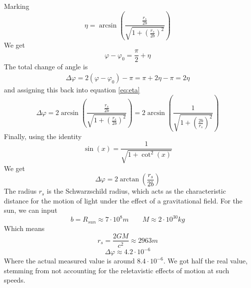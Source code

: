 \documentclass{article}
\begin{document}
Marking
\begin{equation}
\label{eq:eta}
    \eta = \arcsin\left(\frac{\frac{r_s}{2b}}{\sqrt{1 + \left(\frac{r_s}{2b}\right)^2}}\right)
\end{equation}
We get
\begin{equation}
    \varphi - \varphi_0 = \frac{\pi}{2} + \eta
\end{equation}
The total change of angle is
\begin{equation}
\begin{gathered}
    \Delta\varphi = 2(\varphi - \varphi_0) - \pi = \pi + 2\eta - \pi = 2\eta
\end{gathered}
\end{equation}
and assigning this back into equation \ref{eq:eta}
\begin{equation}
    \Delta\varphi = 2\arcsin\left(\frac{\frac{r_s}{2b}}{\sqrt{1 + \left(\frac{r_s}{2b}\right)^2}}\right) = 2\arcsin\left(\frac{1}{\sqrt{1 + \left(\frac{2b}{r_s}\right)^2}}\right)
\end{equation}
Finally, using the identity
\begin{equation}
    \sin(x) = \frac{1}{\sqrt{1+\cot^2(x)}}
\end{equation}
We get
\begin{equation}
    \Delta\varphi = 2\arctan(\frac{r_s}{2b})
\end{equation}
The radius $r_s$ is the Schwarzschild radius, which acts as the characteristic distance for the motion of light under the effect of a gravitational field.
\newline
\newline
For the sun, we can input
\begin{equation}
    b = R_{sun} \approx 7\cdot10^8 m \qquad M \approx 2\cdot10^{30} kg
\end{equation}
Which means
\begin{equation}
    r_s = \frac{2GM}{c^2} \approx 2963 m
\end{equation}
\begin{equation}
    \Delta\varphi \approx 4.2\cdot10^{-6}
\end{equation}
Where the actual measured value is around $8.4\cdot10^{-6}$. We got half the real value, stemming from not accounting for the reletavistic effects of motion at such speeds.
\end{document}

